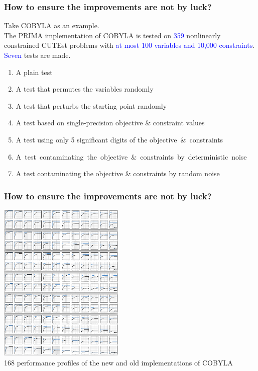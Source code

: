 \documentclass[slidestop,mathserif,xcolor=dvipsnames]{beamer}
\newcommand{\blue}[1]{\textcolor{blue}{#1}}
\begin{document}
\begin{frame}
    \frametitle{How to ensure the improvements are not by luck?}
       Take COBYLA as an example. \\[1ex]
       The PRIMA implementation of COBYLA is tested on \blue{359} nonlinearly constrained CUTEst problems with
       \blue{at most 100 variables and 10,000 constraints}. \blue{Seven} tests are made.
        \vspace{1ex}
         \begin{enumerate}
             \item A plain test
                 \vspace{0.5ex}
             \item A test that permutes the variables randomly
                 \vspace{0.5ex}
             \item A test that perturbs the starting point randomly
                 \vspace{0.5ex}
             \item A test based on single-precision objective \& constraint values
                 \vspace{0.5ex}
             \item A test using only 5 significant digits of the objective~\&~constraints
                 \vspace{0.5ex}
             \item \mbox{A test contaminating the objective\! \&\! constraints by\!~deterministic\!~noise}%
                 \vspace{0.5ex}
             \item A test contaminating the objective \& constraints by random noise
         \end{enumerate}
\end{frame}


\begin{frame}
    \frametitle{How to ensure the improvements are not by luck?}
    \begin{center}
        \includegraphics[width=0.45\textwidth]{cobyla_pp.png}
        \\[1ex]168 performance profiles of the new and old implementations of COBYLA
    \end{center}
\end{frame}
\end{document}
